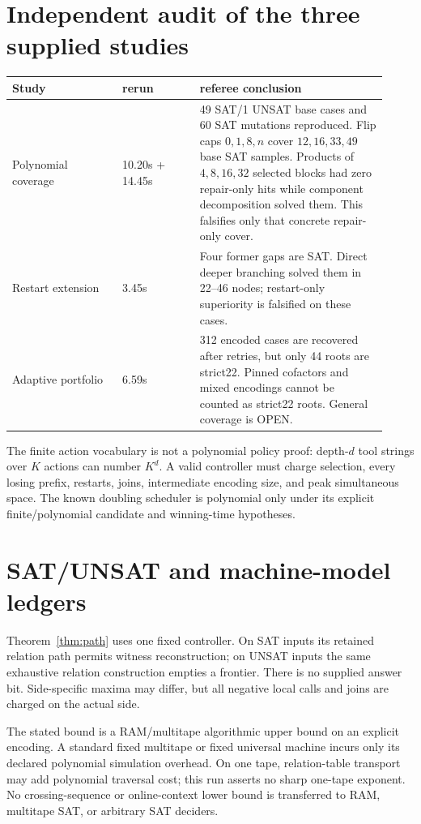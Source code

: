 \documentclass[10pt]{article}
\begin{document}
\section{Independent audit of the three supplied studies}
\begin{center}
\begin{tabular}{p{0.27\linewidth}p{0.19\linewidth}p{0.46\linewidth}}
\toprule
Study & rerun & referee conclusion\\
\midrule
Polynomial coverage & 10.20s + 14.45s & 49 SAT/1 UNSAT base cases and 60 SAT mutations reproduced.  Flip caps $0,1,8,n$ cover $12,16,33,49$ base SAT samples.  Products of $4,8,16,32$ selected blocks had zero repair-only hits while component decomposition solved them.  This falsifies only that concrete repair-only cover.\\
Restart extension & 3.45s & Four former gaps are SAT.  Direct deeper branching solved them in 22--46 nodes; restart-only superiority is falsified on these cases.\\
Adaptive portfolio & 6.59s & 312 encoded cases are recovered after retries, but only 44 roots are strict22.  Pinned cofactors and mixed encodings cannot be counted as strict22 roots.  General coverage is OPEN.\\
\bottomrule
\end{tabular}
\end{center}
The finite action vocabulary is not a polynomial policy proof: depth-$d$ tool strings over $K$
actions can number $K^d$.  A valid controller must charge selection, every losing prefix,
restarts, joins, intermediate encoding size, and peak simultaneous space.  The known doubling
scheduler is polynomial only under its explicit finite/polynomial candidate and winning-time
hypotheses.

\section{SAT/UNSAT and machine-model ledgers}
Theorem~\ref{thm:path} uses one fixed controller.  On SAT inputs its retained relation path
permits witness reconstruction; on UNSAT inputs the same exhaustive relation construction
empties a frontier.  There is no supplied answer bit.  Side-specific maxima may differ, but
all negative local calls and joins are charged on the actual side.

The stated bound is a RAM/multitape algorithmic upper bound on an explicit encoding.  A
standard fixed multitape or fixed universal machine incurs only its declared polynomial
simulation overhead.  On one tape, relation-table transport may add polynomial traversal
cost; this run asserts no sharp one-tape exponent.  No crossing-sequence or online-context
lower bound is transferred to RAM, multitape SAT, or arbitrary SAT deciders.
\end{document}
